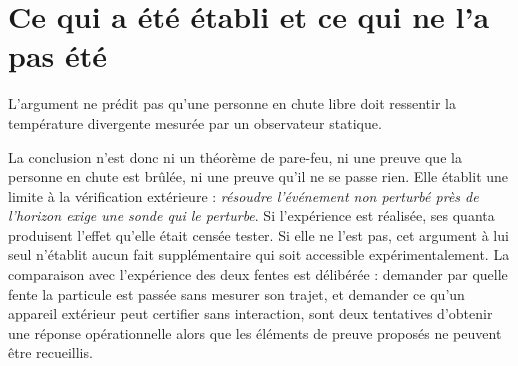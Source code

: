 \begin{classroomqa}
\end{classroomqa}

\enlargethispage{2\baselineskip}
\section{Ce qui a été établi et ce qui ne l’a pas été}

L’argument ne prédit pas qu’une personne en chute libre doit ressentir la température divergente mesurée par un observateur statique.

\begin{classroomqa}
\end{classroomqa}

La conclusion n’est donc ni un théorème de pare-feu, ni une preuve que la personne en chute est brûlée, ni une preuve qu’il ne se passe rien. Elle établit une limite à la vérification extérieure : \emph{résoudre l’événement non perturbé près de l’horizon exige une sonde qui le perturbe}.
Si l’expérience est réalisée, ses quanta produisent l’effet qu’elle était censée tester. Si elle ne l’est pas, cet argument à lui seul n’établit aucun fait supplémentaire qui soit accessible expérimentalement. La comparaison avec l’expérience des deux fentes est délibérée : demander par quelle fente la particule est passée sans mesurer son trajet, et demander ce qu’un appareil extérieur peut certifier sans interaction, sont deux tentatives d’obtenir une réponse opérationnelle alors que les éléments de preuve proposés ne peuvent être recueillis.